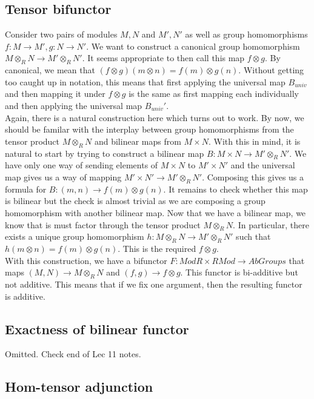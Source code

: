 \documentclass{article}
\newcommand{\tp}[2]{#1 \otimes_R #2}
\theoremstyle{definition}
\theoremstyle{remark}
\theoremstyle{plain}
\begin{document}
\subsection{Tensor bifunctor}

Consider two pairs of modules \(M,N\) and \(M',N'\) as well as group homomorphisms \(f: M \to M', g: N \to N'\). We want to construct a canonical group homomorphism \(\tp{M}{N} \to \tp{M'}{N'}\). It seems appropriate to then 
call this map \(f\otimes g\). By canonical, we mean that \((f\otimes g) (m\otimes n) = f(m)\otimes g(n)\). Without getting too caught up in notation, this means that first applying the universal map \(B_{univ}\)
and then mapping it under \(f\otimes g\) is the same as first mapping each individually and then applying the universal map \(B_{univ}'\).\\
Again, there is a natural construction here which turns out to work. By now, we should be familar with the interplay between group homomorphisms from the tensor product \(\tp{M}{N}\) and bilinear maps from \(M \times N\). With this in mind, 
it is natural to start by trying to construct a bilinear map \(B: M \times N \to \tp{M'}{N'}\). We have only one way of sending elements of \(M\times N\) to \(M' \times N'\) and the universal map gives us a way of mapping \(M'\times N' \to \tp{M'}{N'}\). 
Composing this gives us a formula for \(B: (m,n)\to f(m)\otimes g(n)\). It remains to check whether this map is bilinear but the check is almost trivial as we are composing a group homomorphism with another bilinear map. Now that we have a bilinear map, we know
that is must factor through the tensor product \(\tp{M}{N}\). In particular, there exists a unique group homomorphism \(h: \tp{M}{N}\to \tp{M'}{N'}\) such that \(h(m\otimes n) = f(m)\otimes g(n)\). This is the required \(f\otimes g\).\\

With this construction, we have a bifunctor \(F: ModR\times RMod \to AbGroups\) that maps \((M,N) \to \tp{M}{N}\) and \((f,g)\to f\otimes g\). This functor is bi-additive but not additive. This means that if we fix one argument, then the resulting functor is additive. 

\subsection{Exactness of bilinear functor}

Omitted. Check end of Lec 11 notes. 

\subsection{Hom-tensor adjunction}
\end{document}
